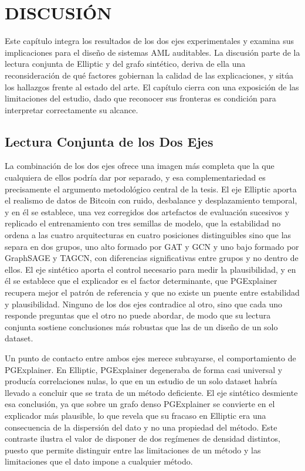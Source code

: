 \chapter{DISCUSIÓN}

Este capítulo integra los resultados de los dos ejes experimentales y examina sus implicaciones para el diseño de sistemas AML auditables. La discusión parte de la lectura conjunta de Elliptic y del grafo sintético, deriva de ella una reconsideración de qué factores gobiernan la calidad de las explicaciones, y sitúa los hallazgos frente al estado del arte. El capítulo cierra con una exposición de las limitaciones del estudio, dado que reconocer sus fronteras es condición para interpretar correctamente su alcance.

\section{Lectura Conjunta de los Dos Ejes}

La combinación de los dos ejes ofrece una imagen más completa que la que cualquiera de ellos podría dar por separado, y esa complementariedad es precisamente el argumento metodológico central de la tesis. El eje Elliptic aporta el realismo de datos de Bitcoin con ruido, desbalance y desplazamiento temporal, y en él se establece, una vez corregidos dos artefactos de evaluación sucesivos y replicado el entrenamiento con tres semillas de modelo, que la estabilidad no ordena a las cuatro arquitecturas en cuatro posiciones distinguibles sino que las separa en dos grupos, uno alto formado por GAT y GCN y uno bajo formado por GraphSAGE y TAGCN, con diferencias significativas entre grupos y no dentro de ellos. El eje sintético aporta el control necesario para medir la plausibilidad, y en él se establece que el explicador es el factor determinante, que PGExplainer recupera mejor el patrón de referencia y que no existe un puente entre estabilidad y plausibilidad. Ninguno de los dos ejes contradice al otro, sino que cada uno responde preguntas que el otro no puede abordar, de modo que su lectura conjunta sostiene conclusiones más robustas que las de un diseño de un solo dataset.

Un punto de contacto entre ambos ejes merece subrayarse, el comportamiento de PGExplainer. En Elliptic, PGExplainer degeneraba de forma casi universal y producía correlaciones nulas, lo que en un estudio de un solo dataset habría llevado a concluir que se trata de un método deficiente. El eje sintético desmiente esa conclusión, ya que sobre un grafo denso PGExplainer se convierte en el explicador más plausible, lo que revela que su fracaso en Elliptic era una consecuencia de la dispersión del dato y no una propiedad del método. Este contraste ilustra el valor de disponer de dos regímenes de densidad distintos, puesto que permite distinguir entre las limitaciones de un método y las limitaciones que el dato impone a cualquier método.

